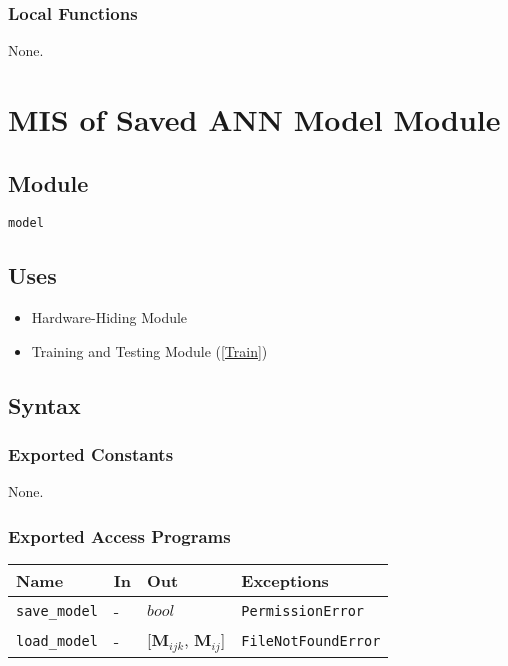 \documentclass[12pt, titlepage]{article}
\def\code#1{\texttt{#1}}
\begin{document}
\subsubsection{Local Functions}
None.


\newpage

\section{MIS of Saved ANN Model Module} \label{SavedANN} 

\subsection{Module}
\code{model} 

\subsection{Uses}
\begin{itemize}
  \item Hardware-Hiding Module  
  \item Training and Testing Module (\ref{Train})
\end{itemize}


\subsection{Syntax}

\subsubsection{Exported Constants}
None.

\subsubsection{Exported Access Programs}

\begin{center}
\begin{tabular}{p{2cm} p{4cm} p{4cm} p{3.5cm}}
\hline
\textbf{Name} & \textbf{In} & \textbf{Out} & \textbf{Exceptions} \\
\hline
\code{save\_model} & - & $bool$ & \code{PermissionError} \\
\code{load\_model} & - & [$\mathbf{M}_{ijk}$, $\mathbf{M}_{ij}$] & \code{FileNotFoundError} \\
\hline
\end{tabular}
\end{center}
\end{document}
